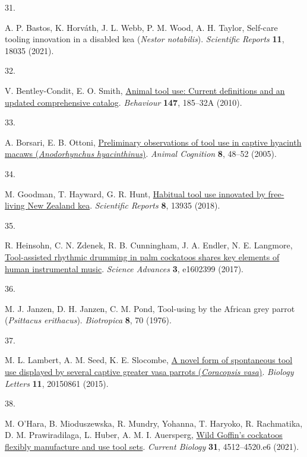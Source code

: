 \documentclass[
  man,floatsintext]{apa6}
\newlength{\cslhangindent}
\newlength{\csllabelwidth}
\newlength{\cslentryspacingunit} %
\newenvironment{CSLReferences}[2] %
 {%
  \setlength{\parindent}{0pt}
  \ifodd #1
  \let\oldpar\par
  \def\par{\hangindent=\cslhangindent\oldpar}
  \fi
  \setlength{\parskip}{#2\cslentryspacingunit}
 }%
 {}
\newcommand{\CSLLeftMargin}[1]{\parbox[t]{\csllabelwidth}{#1}}
\newcommand{\CSLRightInline}[1]{\parbox[t]{\linewidth - \csllabelwidth}{#1}\break}
\begin{document}
\begin{CSLReferences}{0}{0}
\leavevmode{}%
\CSLLeftMargin{31. }%
\CSLRightInline{A. P. Bastos, K. Horváth, J. L. Webb, P. M. Wood, A. H. Taylor, Self-care tooling innovation in a disabled kea (\emph{{N}estor notabilis}). \emph{Scientific Reports} \textbf{11}, 18035 (2021).}

\leavevmode{}%
\CSLLeftMargin{32. }%
\CSLRightInline{V. Bentley-Condit, E. O. Smith, \href{https://doi.org/10.1163/000579509X12512865686555}{Animal tool use: Current definitions and an updated comprehensive catalog}. \emph{Behaviour} \textbf{147}, 185--32A (2010).}

\leavevmode{}%
\CSLLeftMargin{33. }%
\CSLRightInline{A. Borsari, E. B. Ottoni, \href{https://doi.org/10.1007/s10071-004-0221-3}{Preliminary observations of tool use in captive hyacinth macaws (\emph{{A}nodorhynchus hyacinthinus})}. \emph{Animal Cognition} \textbf{8}, 48--52 (2005).}

\leavevmode{}%
\CSLLeftMargin{34. }%
\CSLRightInline{M. Goodman, T. Hayward, G. R. Hunt, \href{https://doi.org/10.1038/s41598-018-32363-9}{Habitual tool use innovated by free-living {N}ew {Z}ealand kea}. \emph{Scientific Reports} \textbf{8}, 13935 (2018).}

\leavevmode{}%
\CSLLeftMargin{35. }%
\CSLRightInline{R. Heinsohn, C. N. Zdenek, R. B. Cunningham, J. A. Endler, N. E. Langmore, \href{https://doi.org/10.1126/sciadv.1602399}{Tool-assisted rhythmic drumming in palm cockatoos shares key elements of human instrumental music}. \emph{Science Advances} \textbf{3}, e1602399 (2017).}

\leavevmode{}%
\CSLLeftMargin{36. }%
\CSLRightInline{M. J. Janzen, D. H. Janzen, C. M. Pond, Tool-using by the {A}frican grey parrot (\emph{{P}sittacus erithacus}). \emph{Biotropica} \textbf{8}, 70 (1976).}

\leavevmode{}%
\CSLLeftMargin{37. }%
\CSLRightInline{M. L. Lambert, A. M. Seed, K. E. Slocombe, \href{https://doi.org/10.1098/rsbl.2015.0861}{A novel form of spontaneous tool use displayed by several captive greater vasa parrots (\emph{{C}oracopsis vasa})}. \emph{Biology Letters} \textbf{11}, 20150861 (2015).}

\leavevmode{}%
\CSLLeftMargin{38. }%
\CSLRightInline{M. O'Hara, B. Mioduszewska, R. Mundry, Yohanna, T. Haryoko, R. Rachmatika, D. M. Prawiradilaga, L. Huber, A. M. I. Auersperg, \href{https://doi.org/10.1016/j.cub.2021.08.009}{Wild {G}offin's cockatoos flexibly manufacture and use tool sets}. \emph{Current Biology} \textbf{31}, 4512--4520.e6 (2021).}


\end{CSLReferences}
\end{document}
